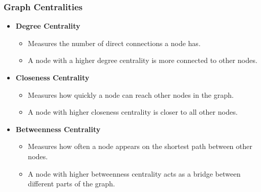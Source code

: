 \begin{frame}[fragile]\frametitle{Graph Centralities}

  \begin{itemize}
    \item \textbf{Degree Centrality}
      \begin{itemize}
        \item Measures the number of direct connections a node has.
        \item A node with a higher degree centrality is more connected to other nodes.
      \end{itemize}


    \item \textbf{Closeness Centrality}
      \begin{itemize}
        \item Measures how quickly a node can reach other nodes in the graph.
        \item A node with higher closeness centrality is closer to all other nodes.
      \end{itemize}

    \item \textbf{Betweenness Centrality}
      \begin{itemize}
        \item Measures how often a node appears on the shortest path between other nodes.
        \item A node with higher betweenness centrality acts as a bridge between different parts of the graph.
      \end{itemize}
  \end{itemize}
   
\end{frame}

